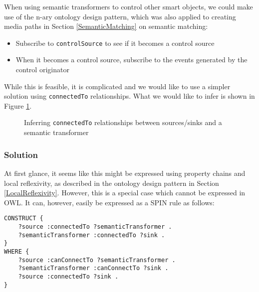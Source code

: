 When using semantic transformers to control other smart objects, we could make use of the n-ary ontology design pattern, which was also applied to creating media paths in Section \ref{SemanticMatching} on semantic matching: %

\begin{itemize}
	\item Subscribe to \texttt{controlSource} to see if it becomes a control source
	\item When it becomes a control source, subscribe to the events generated by the control originator
\end{itemize}

While this is feasible, it is complicated and we would like to use a simpler solution using \texttt{connectedTo} relationships. What we would like to infer is shown in Figure \ref{semanticTransformerControl}.

\begin{figure}[bth] %
	\caption{Inferring \texttt{connectedTo} relationships between sources/sinks and a semantic transformer}
	\label{semanticTransformerControl}        
\end{figure}




\subsubsection{Solution}

At first glance, it seems like this might be expressed using property chains and local reflexivity, as described in the ontology design pattern in Section \ref{LocalReflexivity}. However, this is a special case which cannot be expressed in \ac{OWL}. It can, however, easily be expressed as a \ac{SPIN} rule as follows:

\begin{verbatim}
CONSTRUCT {
    ?source :connectedTo ?semanticTransformer .
    ?semanticTransformer :connectedTo ?sink .
}
WHERE {
    ?source :canConnectTo ?semanticTransformer .
    ?semanticTransformer :canConnectTo ?sink .
    ?source :connectedTo ?sink .
}
\end{verbatim}

